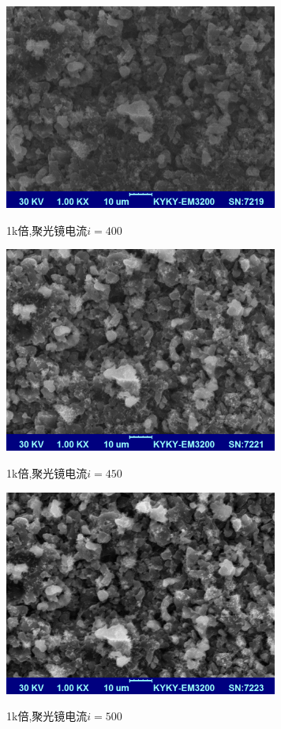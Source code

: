 \documentclass[a4paper]{article}
\begin{document}
\begin{figure}[H]
 \centering
 \caption{1k倍,聚光镜电流$i=400$}
 \includegraphics[height=6.75cm, width=9cm]{pictures/400/1k.bmp}
 \label{result:fig7}
\end{figure}

\begin{figure}[H]
 \centering
 \caption{1k倍,聚光镜电流$i=450$}
 \includegraphics[height=6.75cm, width=9cm]{pictures/450/1k.bmp}
 \label{result:fig8}
\end{figure}

\begin{figure}[H]
 \centering
 \caption{1k倍,聚光镜电流$i=500$}
 \includegraphics[height=6.75cm, width=9cm]{pictures/500/1k.bmp}
 \label{result:fig9}
\end{figure}
\end{document}
